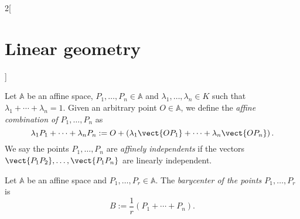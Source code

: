 \documentclass[../../../main.tex]{subfiles}
\begin{document}
\begin{multicols}{2}[\section{Linear geometry}]
    \begin{definition}
        Let $\mathbb{A}$ be an affine space, $P_1,\ldots,P_n\in\mathbb{A}$ and $\lambda_1,\ldots,\lambda_n\in K$ such that $\lambda_1+\cdots+\lambda_n=1$. Given an arbitrary point $O\in\mathbb{A}$, we define the \textit{affine combination of $P_1,\ldots,P_n$} as $$\lambda_1P_1+\cdots+\lambda_nP_n:=O+\left(\lambda_1\vect{OP_1}+\cdots+\lambda_n\vect{OP_n}\right).$$ We say the points $P_1,\ldots,P_n$ are \textit{affinely independents} if the vectors $\vect{P_1P_2},\ldots,\vect{P_1P_n}$ are linearly independent.
    \end{definition}
    \begin{definition}
        Let $\mathbb{A}$ be an affine space and $P_1,\ldots,P_r\in\mathbb{A}$. The \textit{barycenter of the points $P_1,\ldots,P_r$} is $$B:=\frac{1}{r}\left(P_1+\cdots+P_n\right).$$
    \end{definition}

\end{multicols}
\end{document}
